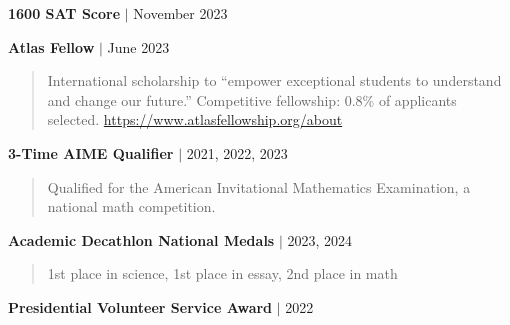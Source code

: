 \documentclass[12pt, letterpaper]{article}
\begin{document}
\noindent \textbf{1600 SAT Score} $\vert$ November 2023

\vspace{5px}

\noindent \textbf{Atlas Fellow} $\vert$ June 2023
\quad
\begin{quotation}
    \noindent International scholarship to “empower exceptional students to understand and change our future.” Competitive fellowship: 0.8\% of applicants selected. \href{https://www.atlasfellowship.org/about}{https://www.atlasfellowship.org/about}
\end{quotation}

\noindent \textbf{3-Time AIME Qualifier} $\vert$ 2021, 2022, 2023
\begin{quotation}
    \noindent Qualified for the American Invitational Mathematics Examination, a national math competition.
\end{quotation}

\noindent \textbf{Academic Decathlon National Medals} $\vert$ 2023, 2024
\begin{quotation}
    \noindent 1st place in science, 1st place in essay, 2nd place in math
\end{quotation}

\noindent \textbf{Presidential Volunteer Service Award} $\vert$ 2022
\end{document}
